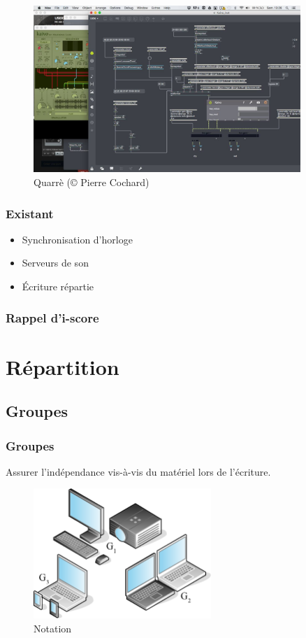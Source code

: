 \documentclass[]{beamer}
\begin{document}
\begin{frame}
\Large
\begin{figure}
	\centering
	\includegraphics[width=0.9\textwidth]{images/quarre-3.jpg}
	\caption{Quarrè (© Pierre Cochard)}
\end{figure}
\end{frame}


\begin{frame}
    \frametitle{Existant}
    \begin{itemize}
        \item Synchronisation d'horloge
        \item Serveurs de son
        \item Écriture répartie
    \end{itemize}
\end{frame}

\begin{frame}
\frametitle{Rappel d'i-score}
\end{frame}

\section{Répartition}


\subsection{Groupes}
\begin{frame}
\frametitle{Groupes}
{\Large Assurer l'indépendance vis-à-vis du matériel lors de l'écriture.}
\begin{figure}
	\centering
	\includegraphics[width=0.6\textwidth]{images/groupes.eps}
	\caption{Notation}
\end{figure}
\end{frame}
\end{document}
